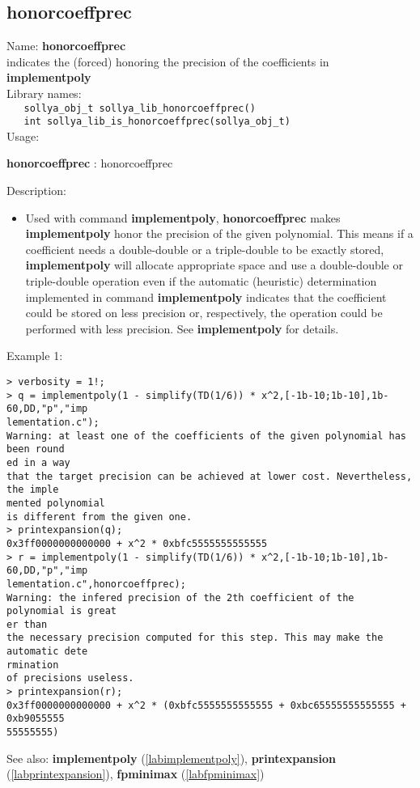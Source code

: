 \subsection{honorcoeffprec}
\label{labhonorcoeffprec}
\noindent Name: \textbf{honorcoeffprec}\\
\phantom{aaa}indicates the (forced) honoring the precision of the coefficients in \textbf{implementpoly}\\[0.2cm]
\noindent Library names:\\
\verb|   sollya_obj_t sollya_lib_honorcoeffprec()|\\
\verb|   int sollya_lib_is_honorcoeffprec(sollya_obj_t)|\\[0.2cm]
\noindent Usage: 
\begin{center}
\textbf{honorcoeffprec} : \textsf{honorcoeffprec}\\
\end{center}
\noindent Description: \begin{itemize}

\item Used with command \textbf{implementpoly}, \textbf{honorcoeffprec} makes \textbf{implementpoly} honor
   the precision of the given polynomial. This means if a coefficient
   needs a double-double or a triple-double to be exactly stored,
   \textbf{implementpoly} will allocate appropriate space and use a double-double
   or triple-double operation even if the automatic (heuristic)
   determination implemented in command \textbf{implementpoly} indicates that the
   coefficient could be stored on less precision or, respectively, the
   operation could be performed with less precision. See \textbf{implementpoly}
   for details.
\end{itemize}
\noindent Example 1: 
\begin{center}\begin{minipage}{15cm}\begin{Verbatim}[frame=single]
> verbosity = 1!;
> q = implementpoly(1 - simplify(TD(1/6)) * x^2,[-1b-10;1b-10],1b-60,DD,"p","imp
lementation.c");
Warning: at least one of the coefficients of the given polynomial has been round
ed in a way
that the target precision can be achieved at lower cost. Nevertheless, the imple
mented polynomial
is different from the given one.
> printexpansion(q);
0x3ff0000000000000 + x^2 * 0xbfc5555555555555
> r = implementpoly(1 - simplify(TD(1/6)) * x^2,[-1b-10;1b-10],1b-60,DD,"p","imp
lementation.c",honorcoeffprec);
Warning: the infered precision of the 2th coefficient of the polynomial is great
er than
the necessary precision computed for this step. This may make the automatic dete
rmination
of precisions useless.
> printexpansion(r);
0x3ff0000000000000 + x^2 * (0xbfc5555555555555 + 0xbc65555555555555 + 0xb9055555
55555555)
\end{Verbatim}
\end{minipage}\end{center}
See also: \textbf{implementpoly} (\ref{labimplementpoly}), \textbf{printexpansion} (\ref{labprintexpansion}), \textbf{fpminimax} (\ref{labfpminimax})
